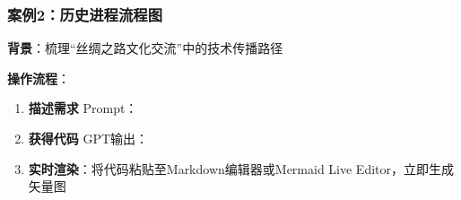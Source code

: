 \hypertarget{ux6848ux4f8b2ux5386ux53f2ux8fdbux7a0bux6d41ux7a0bux56fe}{%
\subsubsection{案例2：历史进程流程图}\label{ux6848ux4f8b2ux5386ux53f2ux8fdbux7a0bux6d41ux7a0bux56fe}}

\textbf{背景}：梳理``丝绸之路文化交流''中的技术传播路径

\textbf{操作流程}：

\begin{enumerate}
\def\labelenumi{\arabic{enumi}.}
\item
  \textbf{描述需求}
  Prompt：
\item
  \textbf{获得代码} GPT输出：
\item
  \textbf{实时渲染}：将代码粘贴至Markdown编辑器或Mermaid Live
  Editor，立即生成矢量图
\end{enumerate}